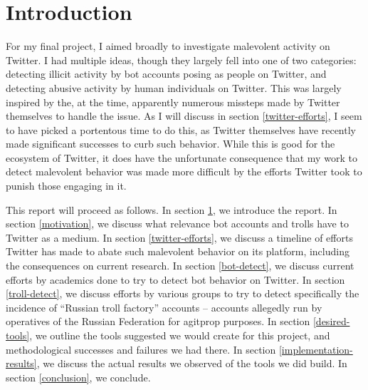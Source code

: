 \documentclass[11pt]{article}
\begin{document}
\HomeworkHeader

\section{Introduction}
\label{intro}
For my final project, I aimed broadly to investigate malevolent activity on Twitter. I had multiple ideas, though they largely fell into one of two categories: detecting illicit activity by bot accounts posing as people on Twitter, and detecting abusive activity by human individuals on Twitter. This was largely inspired by the, at the time, apparently numerous missteps made by Twitter themselves to handle the issue. As I will discuss in section \ref{twitter-efforts}, I seem to have picked a portentous time to do this, as Twitter themselves have recently made significant successes to curb such behavior. While this is good for the ecosystem of Twitter, it does have the unfortunate consequence that my work to detect malevolent behavior was made more difficult by the efforts Twitter took to punish those engaging in it.

This report will proceed as follows. In section \ref{intro}, we introduce the report. In section \ref{motivation}, we discuss what relevance bot accounts and trolls have to Twitter as a medium. In section \ref{twitter-efforts}, we discuss a timeline of efforts Twitter has made to abate such malevolent behavior on its platform, including the consequences on current research. In section \ref{bot-detect}, we discuss current efforts by academics done to try to detect bot behavior on Twitter. In section \ref{troll-detect}, we discuss efforts by various groups to try to detect specifically the incidence of ``Russian troll factory'' accounts -- accounts allegedly run by operatives of the Russian Federation for agitprop purposes. In section \ref{desired-tools}, we outline the tools suggested we would create for this project, and methodological successes and failures we had there. In section \ref{implementation-results}, we discuss the actual results we observed of the tools we did build. In section \ref{conclusion}, we conclude.
\end{document}

